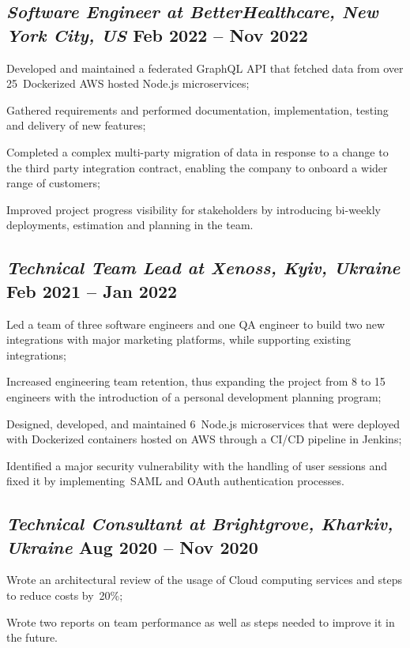 \documentclass[a4paper,12pt]{book}
\begin{document}
\subsection{{\sl\bf\hspace{0.1in}Software Engineer at BetterHealthcare,  New York City, US} \hfill Feb 2022 -- Nov 2022}
\begin{zitemize}
\item Developed and maintained a federated GraphQL API that fetched data from over 25~Dockerized AWS hosted Node.js microservices;
\item Gathered requirements and performed documentation, implementation, testing and delivery of new features;
\item Completed a complex multi-party migration of data in response to a change to the third party integration contract, enabling the company to onboard a wider range of customers;
\item Improved project progress visibility for stakeholders by introducing bi-weekly deployments, estimation and planning in the team.
\end{zitemize}

\subsection{{\sl\bf\hspace{0.1in}Technical Team Lead at Xenoss, Kyiv, Ukraine } \hfill Feb 2021 -- Jan 2022}
\begin{zitemize}
 \item Led a team of three software engineers and one QA engineer to build two new integrations with major marketing platforms, while supporting existing integrations;
 \item Increased engineering team retention, thus expanding the project from 8 to 15 engineers with the introduction of a personal development planning program;
 \item Designed, developed, and maintained 6~Node.js microservices that were deployed with Dockerized containers hosted on AWS through a CI/CD pipeline in Jenkins;
 \item Identified a major security vulnerability with the handling of user sessions and fixed it by implementing~SAML and OAuth authentication processes.
\end{zitemize}

\subsection{{\sl\bf\hspace{0.1in}Technical Consultant at Brightgrove, Kharkiv, Ukraine } \hfill Aug 2020 -- Nov 2020}
\begin{zitemize}
 \item Wrote an architectural review of the usage of Cloud computing services and steps to reduce costs by~20\%;
 \item Wrote two reports on team performance as well as steps needed to improve it in the future.
\end{zitemize}
\end{document}
